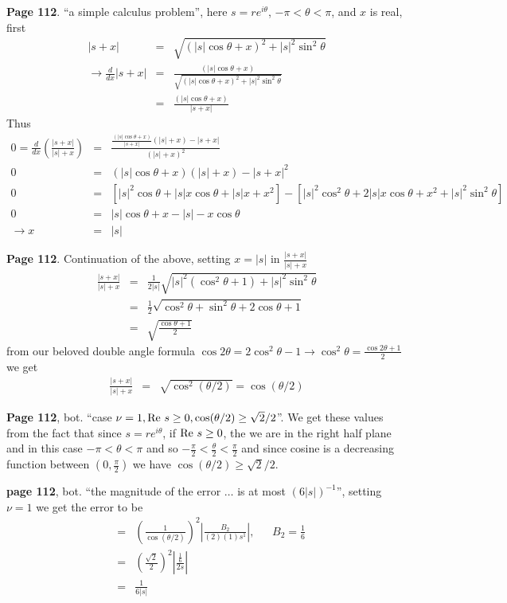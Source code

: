 \documentclass[aps,preprint,preprintnumbers,nofootinbib,showpacs,prd]{revtex4-1}
\newcommand{\nbea}{\begin{eqnarray*}}
\newcommand{\neea}{\end{eqnarray*}}
\newcommand{\re}{{\rm Re}}
\begin{document}
{\bf Page 112}. ``a simple calculus problem'', here $s = re^{i\theta}$, $-\pi < \theta < \pi$, and $x$ is real, first
%
\nbea
|s + x| & = & \sqrt{(|s|\cos\theta + x)^2 + |s|^2\sin^2\theta} \\
\to \frac{d}{dx} |s + x| & = & \frac{(|s|\cos\theta + x)}{\sqrt{(|s|\cos\theta + x)^2 + |s|^2\sin^2\theta}} \\
& = & \frac{(|s|\cos\theta + x)}{|s + x|}
\neea
%
Thus
%
\nbea
0 = \frac{d}{dx} \left ( \frac{|s + x|}{|s| + x} \right ) & = & \frac{\frac{(|s|\cos\theta + x)}{|s + x|} (|s|+x) - |s+x|}{(|s| + x)^2} \\
0 & = & (|s|\cos\theta + x)(|s|+x) - |s + x|^2 \\
0 & = & \left \lbrack |s|^2\cos\theta + |s| x \cos\theta + |s| x + x^2 \right \rbrack - \left \lbrack |s|^2\cos^2\theta + 2|s|x\cos\theta +  x^2 + |s|^2\sin^2\theta \right \rbrack \\
0 & = & |s| \cos\theta + x - |s| - x \cos\theta \\
\to x & = & |s|
\neea
%

{\bf Page 112}. Continuation of the above, setting $x = |s|$ in $\frac{|s + x|}{|s| + x}$
%
\nbea
\frac{|s + x|}{|s| + x} & = & \frac{1}{2|s|} \sqrt{|s|^2(\cos^2\theta + 1) + |s|^2\sin^2\theta} \\
& = & \frac{1}{2} \sqrt{\cos^2\theta + \sin^2\theta + 2\cos\theta + 1} \\
& = & \sqrt{\frac{\cos\theta + 1}{2}}
\neea
%
from our beloved double angle formula $\cos 2\theta = 2\cos^2\theta - 1 \to \cos^2\theta = \frac{\cos 2\theta + 1}{2}$ we get
%
\nbea
\frac{|s + x|}{|s| + x} & = & \sqrt{\cos^2 (\theta/2)} = \cos (\theta/2)
\neea
%

{\bf Page 112}, bot. ``case $\nu=1, \re~ s \ge 0, \cos (\theta/2) \ge \sqrt{2}/2$''. We get these values from the fact that since $s = re^{i\theta}$, if $\re~ s \ge 0$, the we are in the right half plane and in this case $-\pi < \theta < \pi$ and so $-\tfrac{\pi}{2} < \frac{\theta}{2} < \frac{\pi}{2}$ and since cosine is a decreasing function between $(0, \frac{\pi}{2})$ we have $\cos(\theta/2) \ge \sqrt{2}/2$.

{\bf page 112}, bot. ``the magnitude of the error $\dots$ is at most $(6|s|)^{-1}$'', setting $\nu = 1$ we get the error to be
%
\nbea
& = & \left ( \frac{1}{\cos (\theta/2)} \right )^2 \left | \frac{B_2}{(2)(1) s^1} \right |, ~~~~~~~B_2 = \frac{1}{6} \\
& = & \left ( \frac{\sqrt{2}}{2} \right )^2 \left | \frac{\frac{1}{6}}{2 s} \right | \\
& = & \frac{1}{6|s|}
\neea
%
\end{document}
